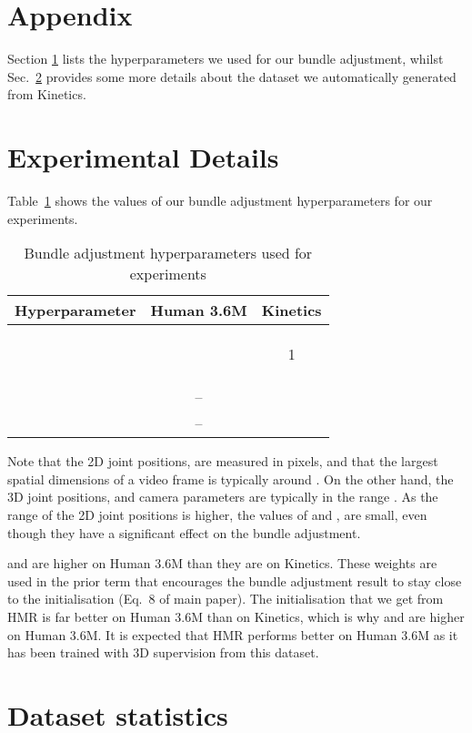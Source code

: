 \documentclass[10pt,twocolumn,letterpaper]{article}
\begin{document}
\section*{Appendix}
Section \ref{sec:exp_details} lists the hyperparameters we used for our bundle adjustment, whilst Sec.~\ref{sec:dataset_stats} provides some more details about the dataset we automatically generated from Kinetics. \section{Experimental Details}
\label{sec:exp_details}

Table~\ref{tab:hyperparam_values} shows the values of our bundle adjustment hyperparameters for our experiments.

\begin{table}[h]
	\centering
	\caption{Bundle adjustment hyperparameters used for experiments
}
	\begin{tabular}{ccc}
	\toprule
	Hyperparameter & Human 3.6M \cite{ionescu_pami_2014} & Kinetics \cite{kay_arxiv_2017} \\ 
	\midrule
	         &     &  \\
	         &     				&  \\    &     				&  \\
	       &    & 1   \\
	         &     				&  \\ 
	         &     &  \\          &     & \\
	            & --    & \\
	            & --    &  \\
  \bottomrule
	\end{tabular}
\label{tab:hyperparam_values}
\end{table} 
Note that the 2D joint positions,  are measured in pixels, and that the largest spatial dimensions of a video frame is typically around .
On the other hand, the 3D joint positions,  and camera parameters are typically in the range .
As the range of the 2D joint positions is higher, the values of  and , are small, even though they have a significant effect on the bundle adjustment.

 and  are higher on Human 3.6M than they are on Kinetics.
These weights are used in the prior term that encourages the bundle adjustment result to stay close to the initialisation (Eq.~8 of main paper). 
The initialisation that we get from HMR \cite{kanazawa_cvpr_2018} is far better on Human 3.6M than on Kinetics, which is why  and  are higher on Human 3.6M.
It is expected that HMR performs better on Human 3.6M as it has been trained with 3D supervision from this dataset. \section{Dataset statistics}
\label{sec:dataset_stats}
\end{document}
